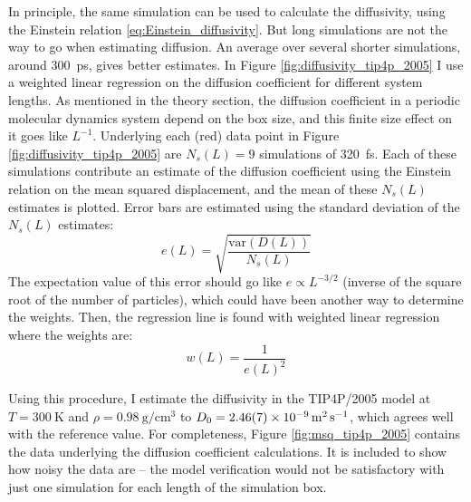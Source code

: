In principle, the same simulation can be used to calculate the diffusivity, using the Einstein relation \ref{eq:Einstein_diffusivity}. But long simulations are not the way to go when estimating diffusion. An average over several shorter simulations, around \SI{300}{\pico\second}, gives better estimates. 
In Figure \ref{fig:diffusivity_tip4p_2005} I use a weighted linear regression on the diffusion coefficient for different system lengths. As mentioned in the theory section, the diffusion coefficient in a periodic molecular dynamics system depend on the box size, and this finite size effect on it goes like $L^{-1}$. Underlying each (red) data point in Figure \ref{fig:diffusivity_tip4p_2005} are $N_s(L)=9$ simulations of \SI{320}{\femto\second}. Each of these simulations contribute an estimate of the diffusion coefficient using the Einstein relation on the mean squared displacement, and the mean of these $N_s(L)$ estimates is plotted. Error bars are estimated using the standard deviation of the $N_s(L)$ estimates: 
\begin{equation}
	e(L) = \sqrt{\frac{\text{var}(D(L))}{N_s(L)}}
\end{equation}
The expectation value of this error should go like $e \propto L^{-3/2}$ (inverse of the square root of the number of particles), which could have been another way to determine the weights.
Then, the regression line is found with weighted linear regression where the weights are:
\begin{equation}
	w(L) = \frac{1}{e(L)^2}
\end{equation}

Using this procedure, I estimate the diffusivity in the TIP4P/2005 model at $T=\SI{300}{\kelvin}$ and $\rho = \SI{0.98}{\gram\per\centi\meter\cubed}$ to $D_0=\text{\SI{2.46\pm0.07d-9}{\meter\squared\per\second}}$, which agrees well with the reference value. For completeness, Figure \ref{fig:msq_tip4p_2005} contains the data underlying the diffusion coefficient calculations. It is included to show how noisy the data are -- the model verification would not be satisfactory with just one simulation for each length of the simulation box.

